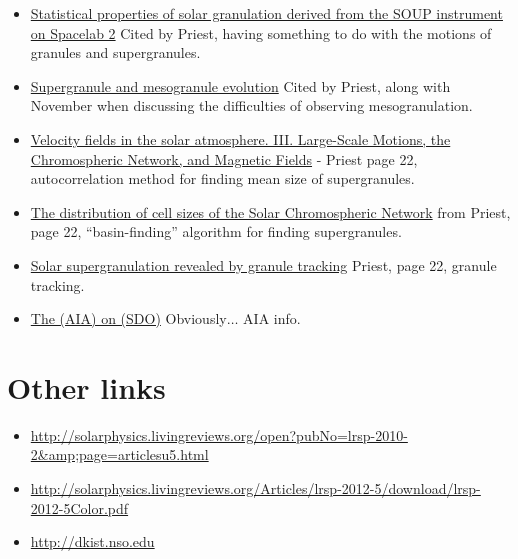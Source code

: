 \documentclass{article}
\begin{document}
\begin{itemize}
        {Mesoscale dynamics on the Sun's surface from HINODE
        observations}
    \item \href{http://cdsads.u-strasbg.fr/abs/1989ApJ...336..475T}
        {Statistical properties of solar granulation derived
        from the SOUP instrument on Spacelab 2}
        Cited by Priest, having something to do with the motions of granules and supergranules.
    \item \href{http://cdsads.u-strasbg.fr/abs/2000SoPh..193..313S}
        {Supergranule and mesogranule evolution}
        Cited by Priest, along with November when
        discussing the difficulties of observing mesogranulation.
    \item \href{http://cdsads.u-strasbg.fr/abs/1964ApJ...140.1120S}
        {Velocity fields in the solar atmosphere. III.
        Large-Scale Motions, the Chromospheric Network, and Magnetic Fields}
        - Priest
        page 22, autocorrelation method for finding mean size of supergranules.
    \item \href{http://cdsads.u-strasbg.fr/abs/1997ApJ...481..988H}
        {The distribution of cell sizes of the Solar Chromospheric Network}
        from Priest, page 22, ``basin-finding'' algorithm for finding
        supergranules.
    \item \href{http://cdsads.u-strasbg.fr/abs/2008A\%26A...479L..17R}
        {Solar supergranulation revealed by granule tracking}
        Priest, page 22, granule tracking.
    \item \href{http://cdsads.u-strasbg.fr/abs/2012SoPh..275...17L}
            {The (AIA) on (SDO)}
            Obviously$\ldots$ AIA info.
\end{itemize}

\section{Other links}
\begin{itemize}
    \item \url{http://solarphysics.livingreviews.org/open?pubNo=lrsp-2010-2&amp;page=articlesu5.html}
    \item \url{http://solarphysics.livingreviews.org/Articles/lrsp-2012-5/download/lrsp-2012-5Color.pdf}
    \item \url{http://dkist.nso.edu}
\end{itemize}

%
\end{document}
